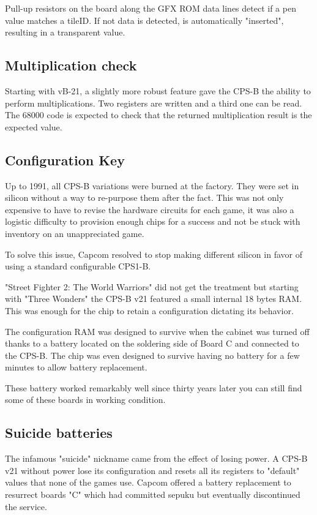 \begin{trivia}
Pull-up resistors on the board along the GFX ROM data lines detect if a pen value matches a tileID. If not data is detected,  is automatically "inserted", resulting in a transparent value.
\end{trivia}

\subsection{Multiplication check}
Starting with vB-21, a slightly more robust feature gave the CPS-B the ability to perform multiplications. Two registers are written and a third one can be read. The 68000 code is expected to check that the returned multiplication result is the expected value.

\subsection{Configuration Key}
Up to 1991, all CPS-B variations were burned at the factory. They were set in silicon without a way to re-purpose them after the fact. This was not only expensive to have to revise the hardware circuits for each game, it was also a logistic difficulty to provision enough chips for a success and not be stuck with inventory on an unappreciated game.

To solve this issue, Capcom resolved to stop making different silicon in favor of using a standard configurable CPS1-B.

"Street Fighter 2: The World Warriors" did not get the treatment but starting with "Three Wonders" the CPS-B v21 featured a small internal 18 bytes RAM. This was enough for the chip to retain a configuration dictating its behavior\cite{petitSecurity}.

The configuration RAM was designed to survive when the cabinet was turned off thanks to a battery located  on the soldering side of Board C and connected to the CPS-B. The chip was even designed to survive having no battery for a few minutes to allow battery replacement.

\begin{trivia}
These battery worked remarkably well since thirty years later you can still find some of these boards in working condition.
\end{trivia}

\subsection{Suicide batteries}
The infamous "suicide" nickname came from the effect of losing power. A CPS-B v21 without power lose its configuration and resets all its registers to "default" values that none of the games use. Capcom offered a battery replacement to resurrect boards "C" which had committed sepuku but eventually discontinued the service. 

